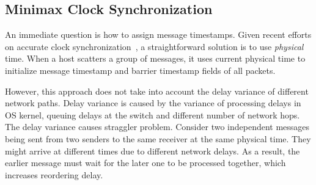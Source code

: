 \subsection{Minimax Clock Synchronization}
\label{sec:sync}


An immediate question is how to assign message timestamps. Given recent efforts on accurate clock synchronization~\cite{correll2005design,corbett2013spanner,lee2016globally,geng2018exploiting}, a straightforward solution is to use \emph{physical} time. When a host scatters a group of messages, it uses current physical time to initialize message timestamp and barrier timestamp fields of all packets.

However, this approach does not take into account the delay variance of different network paths. Delay variance is caused by the variance of processing delays in OS kernel, queuing delays at the switch and different number of network hops. The delay variance causes straggler problem. Consider two independent messages being sent from two senders to the same receiver at the same physical time. They might arrive at different times due to different network delays. As a result, the earlier message must wait for the later one to be processed together, which increases reordering delay.


